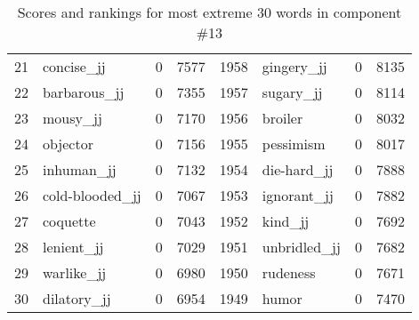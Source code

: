 \begin{table}[tbp]
\begin{tabular}{| rlr@{.}l | rlr@{.}l |}
    21 & concise\_jj & 0 & 7577    &    1958 & gingery\_jj & 0 & 8135 \\
    22 & barbarous\_jj & 0 & 7355    &    1957 & sugary\_jj & 0 & 8114 \\
    23 & mousy\_jj & 0 & 7170    &    1956 & broiler & 0 & 8032 \\
    24 & objector & 0 & 7156    &    1955 & pessimism & 0 & 8017 \\
    25 & inhuman\_jj & 0 & 7132    &    1954 & die-hard\_jj & 0 & 7888 \\
    26 & cold-blooded\_jj & 0 & 7067    &    1953 & ignorant\_jj & 0 & 7882 \\
    27 & coquette & 0 & 7043    &    1952 & kind\_jj & 0 & 7692 \\
    28 & lenient\_jj & 0 & 7029    &    1951 & unbridled\_jj & 0 & 7682 \\
    29 & warlike\_jj & 0 & 6980    &    1950 & rudeness & 0 & 7671 \\
    30 & dilatory\_jj & 0 & 6954    &    1949 & humor & 0 & 7470 \\
    \hline
    \end{tabular}
    \caption{Scores and rankings for most extreme 30 words in component \#13} 
\end{table}
\clearpage
